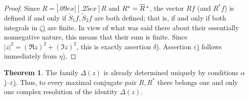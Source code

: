 \documentclass[
  paper=b5,
  twoside=true,
  fontsize=13pt,
  headings=normal,
  bookmarkpackage=false
]{scrartcl}
\theoremstyle{definition}
\newtheorem{theorem}{Theorem}
\newcommand{\MaximalExtension}[1]{\overbracket[.09ex][.25ex]{#1}}
\newcommand{\AdjointMaximalExtension}[1]{\MaximalExtension{#1}\vphantom{#1}^{*}}
\begin{document}
\begin{proof}
Since \(R=\MaximalExtension{R}\) and
\(R^*=\AdjointMaximalExtension{R}\), the vector \(Rf\) (and \(R^*f\)) is defined
if and only if \(\widetilde S_1f,\widetilde S_2f\) are both defined;
that is, if and only if both integrals in \hyperref[thm:17:zeta]{\(\zeta\))} are finite.  In
view of what was said there about their essentially nonnegative nature,
this means that their sum is finite.  Since
\(|z|^2=(\Re z)^2+(\Im z)^2\), this is exactly assertion \hyperref[thm:17:delta]{\(\delta\))}.  Assertion \hyperref[thm:17:epsilon]{\(\varepsilon\))}
follows immediately from \hyperref[thm:17:eta]{\(\eta\))}.
\end{proof}

\begin{theorem}\label{thm:18}
The family \(\Delta(z)\) is already determined uniquely by conditions
\hyperref[thm:17:alpha]{\(\alpha\))}--\hyperref[thm:17:epsilon]{\(\varepsilon\))}.  Thus, to every maximal conjugate pair
\(R,R^*\) there belongs one and only one complex resolution of the
identity \(\Delta(z)\).
\end{theorem}
\end{document}

